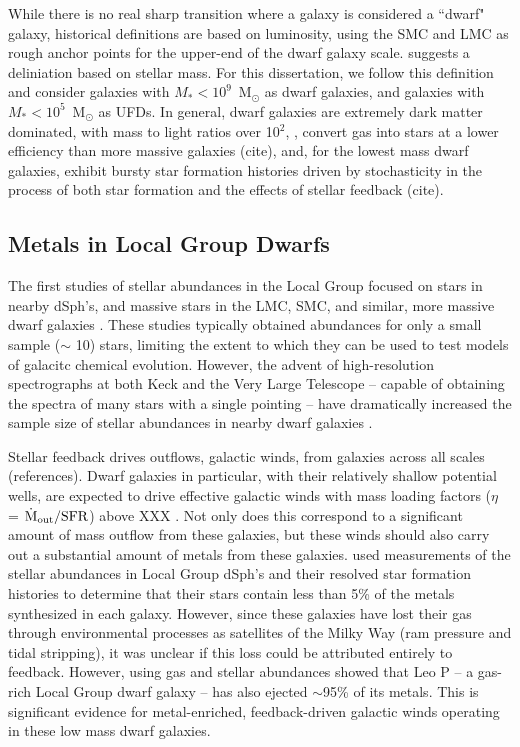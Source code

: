 While there is no real sharp transition where a galaxy is considered a ``dwarf" galaxy, historical definitions are based on luminosity, using the SMC and LMC as rough anchor points for the upper-end of the dwarf galaxy scale. \cite{Bullock2017} suggests a deliniation based on stellar mass. For this dissertation, we follow this definition and consider galaxies with $M_* < 10^9$~M$_{\odot}$ as dwarf galaxies, and galaxies with $M_* < 10^5$~M$_{\odot}$ as UFDs. In general, dwarf galaxies are extremely dark matter dominated, with mass to light ratios over 10$^2$, \citep{SimonGeha2007,Strigari2009,Wolf2010}, convert gas into stars at a lower efficiency than more massive galaxies (cite), and, for the lowest mass dwarf galaxies, exhibit bursty star formation histories driven by stochasticity in the process of both star formation and the effects of stellar feedback (cite).

\subsection{Metals in Local Group Dwarfs}

The first studies of stellar abundances in the Local Group focused on stars in nearby dSph's, and massive stars in the LMC, SMC, and similar, more massive dwarf galaxies \citep[e.g.][]{}. These studies typically obtained abundances for only a small sample ($\sim$ 10) stars, limiting the extent to which they can be used to test models of galacitc chemical evolution.  However, the advent of high-resolution spectrographs at both Keck and the Very Large Telescope -- capable of obtaining the spectra of many stars with a single pointing -- have dramatically increased the sample size of stellar abundances in nearby dwarf galaxies \citep[e.g.][]{}. 

Stellar feedback drives outflows, galactic winds, from galaxies across all scales (references). Dwarf galaxies in particular, with their relatively shallow potential wells, are expected to drive effective galactic winds \citep{MacLowFerrara1999} with mass loading factors ($\eta$ = $\dot{\rm{M}}_{\rm out} / {\rm SFR}$) above XXX \citep{Muratov2015,Christensen2018}. Not only does this correspond to a significant amount of mass outflow from these galaxies, but these winds should also carry out a substantial amount of metals from these galaxies. \cite{Kirby2011-metals} used measurements of the stellar abundances in Local Group dSph's and their resolved star formation histories to determine that their stars contain less than 5\% of the metals synthesized in each galaxy. However, since these galaxies have lost their gas through environmental processes as satellites of the Milky Way (ram pressure and tidal stripping), it was unclear if this loss could be attributed entirely to feedback. However, using gas and stellar abundances \cite{McQuinn2015} showed that Leo P -- a gas-rich Local Group dwarf galaxy -- has also ejected $\sim$95\% of its metals. This is significant evidence for metal-enriched, feedback-driven galactic winds operating in these low mass dwarf galaxies. 

